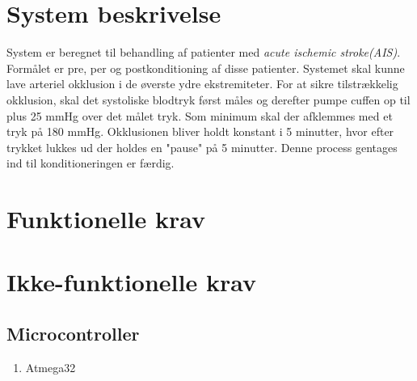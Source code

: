 \documentclass[11pt]{article}
\begin{document}
	\section{System beskrivelse}
	System er beregnet til behandling af patienter med \textit{acute ischemic stroke(AIS)}. Formålet er pre, per og postkonditioning af disse patienter. Systemet skal kunne lave arteriel okklusion i de øverste ydre ekstremiteter. For at sikre tilstrækkelig okklusion, skal det systoliske blodtryk først måles og derefter pumpe cuffen op til plus 25 mmHg over det målet tryk. Som minimum skal der afklemmes med et tryk på 180 mmHg. Okklusionen bliver holdt konstant i 5 minutter, hvor efter trykket lukkes ud der holdes en "pause" på 5 minutter. Denne process gentages ind til konditioneringen er færdig. 

	\section{Funktionelle krav}
	
	
	\pagebreak
	
	
	
	
	
	
	
	
	
	
	
	
	
	
	
	
	
	\section{Ikke-funktionelle krav }
	
	\subsection{Microcontroller}
	\begin{enumerate}
		\setlength\itemsep{0cm}
		\item Atmega32
		\end{enumerate}
	
\end{document}
